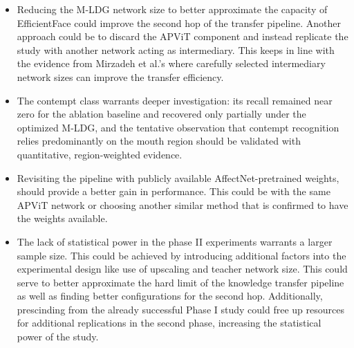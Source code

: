 \begin{itemize}


	\item Reducing the M-LDG network size to better approximate the capacity of EfficientFace could improve the second hop of the transfer pipeline. Another approach could be to discard the APViT component and instead replicate the study with another network acting as intermediary. This keeps in line with the evidence from Mirzadeh et al.'s \cite{mirzadeh2020takd} where carefully selected intermediary network sizes can improve the transfer efficiency.

	\item The contempt class warrants deeper investigation: its recall remained near zero for the ablation baseline and recovered only partially under the optimized M-LDG, and the tentative observation that contempt recognition relies predominantly on the mouth region should be validated with quantitative, region-weighted evidence.

	\item Revisiting the pipeline with publicly available AffectNet-pretrained weights, should provide a better gain in performance. This could be with the same APViT network or choosing another similar method that is confirmed to have the weights available.
	
	\item The lack of statistical power in the phase II experiments warrants a larger sample size. This could be achieved by introducing additional factors into the experimental design like use of upscaling and teacher network size. This could serve to better approximate the hard limit of the knowledge transfer pipeline as well as finding better configurations for the second hop. Additionally, prescinding from the already successful Phase I study could free up resources for additional replications in the second phase, increasing the statistical power of the study.

\end{itemize}
